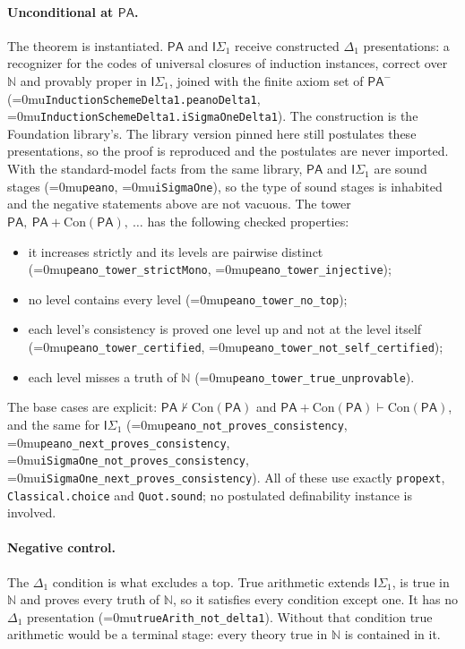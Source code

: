 \documentclass[11pt]{article}
\newcommand{\leanname}[1]{\textup{\Urlmuskip=0mu\relax\nolinkurl{#1}}}
\theoremstyle{definition}
\theoremstyle{remark}
\begin{document}
\paragraph{Unconditional at $\mathsf{PA}$.}  The theorem is instantiated.
$\mathsf{PA}$ and $\mathsf{I}\Sigma_1$ receive constructed $\Delta_1$
presentations: a recognizer for the codes of universal closures of induction
instances, correct over $\mathbb N$ and provably proper in $\mathsf{I}\Sigma_1$,
joined with the finite axiom set of $\mathsf{PA}^-$
(\leanname{InductionSchemeDelta1.peanoDelta1},
\leanname{InductionSchemeDelta1.iSigmaOneDelta1}).  The construction is the
Foundation library's.  The library version pinned here still postulates these
presentations, so the proof is reproduced and the postulates are never
imported.  With the standard-model facts from the same library, $\mathsf{PA}$
and $\mathsf{I}\Sigma_1$ are sound stages (\leanname{peano},
\leanname{iSigmaOne}), so the type of sound stages is inhabited and the
negative statements above are not vacuous.  The tower
$\mathsf{PA},\ \mathsf{PA}+\mathrm{Con}(\mathsf{PA}),\ \ldots$ has the following
checked properties:
\begin{itemize}[leftmargin=*]
\item it increases strictly and its levels are pairwise distinct
  (\leanname{peano_tower_strictMono}, \leanname{peano_tower_injective});
\item no level contains every level (\leanname{peano_tower_no_top});
\item each level's consistency is proved one level up and not at the level
  itself (\leanname{peano_tower_certified},
  \leanname{peano_tower_not_self_certified});
\item each level misses a truth of $\mathbb N$
  (\leanname{peano_tower_true_unprovable}).
\end{itemize}
The base cases are explicit: $\mathsf{PA}\nvdash\mathrm{Con}(\mathsf{PA})$ and
$\mathsf{PA}+\mathrm{Con}(\mathsf{PA})\vdash\mathrm{Con}(\mathsf{PA})$, and the same
for $\mathsf{I}\Sigma_1$ (\leanname{peano_not_proves_consistency},
\leanname{peano_next_proves_consistency},
\leanname{iSigmaOne_not_proves_consistency},
\leanname{iSigmaOne_next_proves_consistency}).  All of these use exactly
\texttt{propext}, \texttt{Classical.choice} and \texttt{Quot.sound}; no
postulated definability instance is involved.

\paragraph{Negative control.}  The $\Delta_1$ condition is what excludes a top.
True arithmetic extends $\mathsf{I}\Sigma_1$, is true in $\mathbb N$ and proves
every truth of $\mathbb N$, so it satisfies every condition except one.  It has
no $\Delta_1$ presentation (\leanname{trueArith_not_delta1}).  Without that
condition true arithmetic would be a terminal stage: every theory true in
$\mathbb N$ is contained in it.
\end{document}
